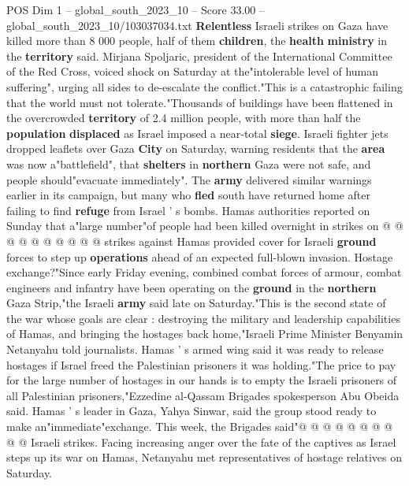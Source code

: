 \begin{textsample}{POS Dim 1 – global\_south\_2023\_10 – Score 33.00 – global\_south\_2023\_10/103037034.txt}  \label{ex:f1_pos_190}
\textbf{Relentless} Israeli strikes on Gaza have killed more than 8 000 people, half of them \textbf{children}, the \textbf{health} \textbf{ministry} in the \textbf{territory} said.
Mirjana Spoljaric, president of the International Committee of the Red Cross, voiced shock on Saturday at the"intolerable level of human suffering", urging all sides to de-escalate the conflict."This is a catastrophic failing that the world must not tolerate."Thousands of buildings have been flattened in the overcrowded \textbf{territory} of 2.4 million people, with more than half the \textbf{population} \textbf{displaced} as Israel imposed a near-total \textbf{siege}.
Israeli fighter jets dropped leaflets over Gaza \textbf{City} on Saturday, warning residents that the \textbf{area} was now a"battlefield", that \textbf{shelters} in \textbf{northern} Gaza were not safe, and people should"evacuate immediately".
The \textbf{army} delivered similar warnings earlier in its campaign, but many who \textbf{fled} south have returned home after failing to find \textbf{refuge} from Israel ' s bombs.
Hamas authorities reported on Sunday that a"large number"of people had been killed overnight in strikes on @ @ @ @ @ @ @ @ @ @ strikes against Hamas provided cover for Israeli \textbf{ground} forces to step up \textbf{operations} ahead of an expected full-blown invasion.
Hostage exchange?"Since early Friday evening, combined combat forces of armour, combat engineers and infantry have been operating on the \textbf{ground} in the \textbf{northern} Gaza Strip,"the Israeli \textbf{army} said late on Saturday."This is the second state of the war whose goals are clear : destroying the military and leadership capabilities of Hamas, and bringing the hostages back home,"Israeli Prime Minister Benyamin Netanyahu told journalists.
Hamas ' s armed wing said it was ready to release hostages if Israel freed the Palestinian prisoners it was holding."The price to pay for the large number of hostages in our hands is to empty the Israeli prisoners of all Palestinian prisoners,"Ezzedine al-Qassam Brigades spokesperson Abu Obeida said.
Hamas ' s leader in Gaza, Yahya Sinwar, said the group stood ready to make an"immediate"exchange.
This week, the Brigades said"@ @ @ @ @ @ @ @ @ @ Israeli strikes.
Facing increasing anger over the fate of the captives as Israel steps up its war on Hamas, Netanyahu met representatives of hostage relatives on Saturday.

\end{textsample}
